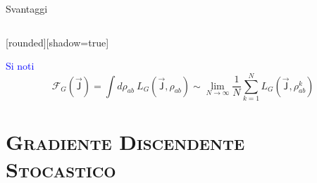\documentclass[xcolor=x11names,compress]{beamer}
\renewcommand{\(}{\begin{columns}}
\renewcommand{\)}{\end{columns}}
\newcommand{\<}[1]{\begin{column}{#1}}
\renewcommand{\>}{\end{column}}
\begin{document}
\begin{frame}
\begin{columns}[c]
\begin{column}{0.45\textwidth}
\begin{block}{\textsf{\small{Svantaggi}}}
\end{block}

\end{column}
\end{columns}


[rounded][shadow=true]
\begin{block}{\textcolor{blue}{Si noti}}
\small{$$\mathcal{F}_G \left( \vec{\textsf{J}} \right) = \int d \rho_{ab} \ L_G \left( \vec{\textsf{J}}, \rho_{ab} \right) \sim \lim_{N \rightarrow \infty} \dfrac{1}{N} \sum_{k=1}^N L_G \left( \vec{\textsf{J}}, \rho_{ab}^k \right)$$}
\end{block}

\end{frame}

\section{\scshape Gradiente Discendente Stocastico}%
\end{document}
